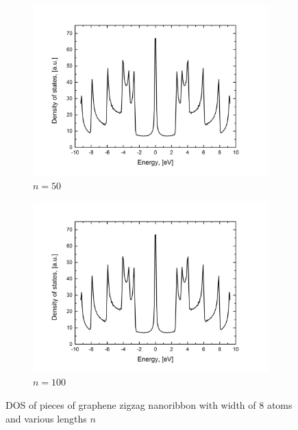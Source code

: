 \begin{figure}[hb!]
\begin{subfigure}{.45\textwidth}
  \includegraphics[width=\linewidth]{img/zz_chain_50_dos}
  \caption{$n=50$}
  \label{fig:chain50}
\end{subfigure}
\begin{subfigure}{.45\textwidth}
  \centering
  \includegraphics[width=\linewidth]{img/zz_chain_100_dos}
  \caption{$n=100$}
  \label{fig:chain100}
\end{subfigure}
\caption{DOS of pieces of graphene zigzag nanoribbon with width of $8$ atoms and various lengths $n$\label{fig:zz_chain}}
\end{figure}

